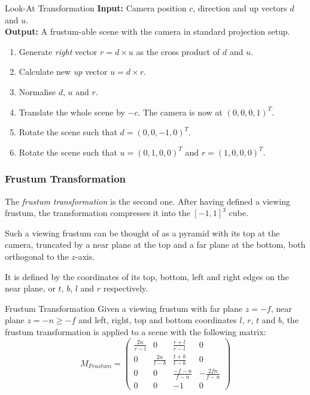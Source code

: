 \documentclass[english]{panikzettel}
\begin{document}
\begin{algo}{Look-At Transformation}
\textbf{Input:} Camera position $c$, direction and up vectors $d$ and $u$. \\
\textbf{Output:} A frustum-able scene with the camera in standard projection setup.
\tcblower
\begin{enumerate}
    \item Generate \emph{right} vector $r = d \times u$ as the cross product of $d$ and $u$.
    \item Calculate new \emph{up} vector $u = d \times r$.
    \item Normalise $d$, $u$ and $r$.
    \item Translate the whole scene by $-c$. The camera is now at $(0, 0, 0, 1)^T$.
    \item Rotate the scene such that $d = (0, 0, -1, 0)^T$.
    \item Rotate the scene such that $u = (0, 1, 0, 0)^T$ and $r = (1, 0, 0, 0)^T$.
\end{enumerate}
\end{algo}

\subsubsection*{Frustum Transformation}

\begin{halfboxl}
The \emph{frustum transformation} is the second one. After having defined a viewing frustum, the transformation compresses it into the $[-1,1]^3$ cube.

Such a viewing frustum can be thought of as a pyramid with its top at the camera, truncated by a near plane at the top and a far plane at the bottom, both orthogonal to the $z$-axis.

It is defined by the coordinates of its top, bottom, left and right edges on the near plane, or $t$, $b$, $l$ and $r$ respectively.

\end{halfboxl}%
\begin{halfboxr}
\vspace{-\baselineskip}
\begin{defi}{Frustum Transformation}
Given a viewing frustum with far plane $z = -f$, near plane $z = -n \ge -f$ and left, right, top and bottom coordinates $l$, $r$, $t$ and $b$, the frustum transformation is applied to a scene with the following matrix:
$$M_{Frustum} = \begin{pmatrix}
\frac{2n}{r-l} & 0 & \frac{r+l}{r-l} & 0 \\
0 & \frac{2n}{t-b} & \frac{t+b}{t-b} & 0 \\
0 & 0 & \frac{-f-n}{f-n} & -\frac{2fn}{f-n} \\
0 & 0 & -1 & 0
\end{pmatrix}$$
\end{defi}
\end{halfboxr}
\end{document}
